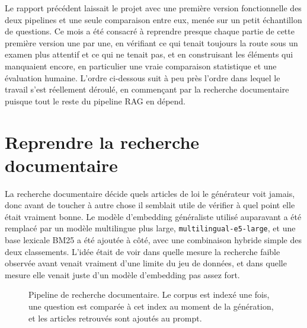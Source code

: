 \documentclass[11pt, a4paper]{article}
\begin{document}
Le rapport pr\'ec\'edent laissait le projet avec une premi\`ere version fonctionnelle des deux pipelines et une seule comparaison entre eux, men\'ee sur un petit \'echantillon de questions. Ce mois a \'et\'e consacr\'e \`a reprendre presque chaque partie de cette premi\`ere version une par une, en v\'erifiant ce qui tenait toujours la route sous un examen plus attentif et ce qui ne tenait pas, et en construisant les \'el\'ements qui manquaient encore, en particulier une vraie comparaison statistique et une \'evaluation humaine. L'ordre ci-dessous suit \`a peu pr\`es l'ordre dans lequel le travail s'est r\'eellement d\'eroul\'e, en commen\c{c}ant par la recherche documentaire puisque tout le reste du pipeline RAG en d\'epend.

\section{Reprendre la recherche documentaire}

La recherche documentaire d\'ecide quels articles de loi le g\'en\'erateur voit jamais, donc avant de toucher \`a autre chose il semblait utile de v\'erifier \`a quel point elle \'etait vraiment bonne. Le mod\`ele d'embedding g\'en\'eraliste utilis\'e auparavant a \'et\'e remplac\'e par un mod\`ele multilingue plus large, \texttt{multilingual-e5-large}, et une base lexicale BM25 a \'et\'e ajout\'ee \`a c\^ot\'e, avec une combinaison hybride simple des deux classements. L'id\'ee \'etait de voir dans quelle mesure la recherche faible observ\'ee avant venait vraiment d'une limite du jeu de donn\'ees, et dans quelle mesure elle venait juste d'un mod\`ele d'embedding pas assez fort.

\begin{figure}[H]
\centering
{}
\caption{Pipeline de recherche documentaire. Le corpus est index\'e une fois, une question est compar\'ee \`a cet index au moment de la g\'en\'eration, et les articles retrouv\'es sont ajout\'es au prompt.}
\label{fig:ragdiagram}
\end{figure}
\end{document}
